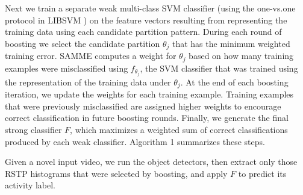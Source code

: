 Next we train a separate weak multi-class SVM classifier (using the one-vs.one protocol in LIBSVM \cite{Chang11})
	 on the feature vectors resulting from representing the training
	data using each candidate partition pattern. 
 During each round of boosting we select the
	candidate partition $\theta_j$ that has the minimum  weighted training error.
  SAMME computes a weight for $\theta_j$ based on how many training
  examples were misclassified using $f_{\theta_j}$, the SVM classifier
  that was trained using the representation of the training data under
  $\theta_j$.
  At the end of each boosting iteration, we update the weights for each
  training example. Training examples that were previously misclassified are
  assigned higher weights to encourage correct classification in future
  boosting rounds.  Finally, we generate the
	final strong classifier $F$, which maximizes a weighted
  sum of correct classifications produced by each weak classifier.   Algorithm 1 summarizes these steps.
  
  Given a novel input video, we run the object detectors, then extract only those RSTP histograms that were selected by boosting, and apply $F$ to predict its activity label.
  
  
  
  














%
%
%

